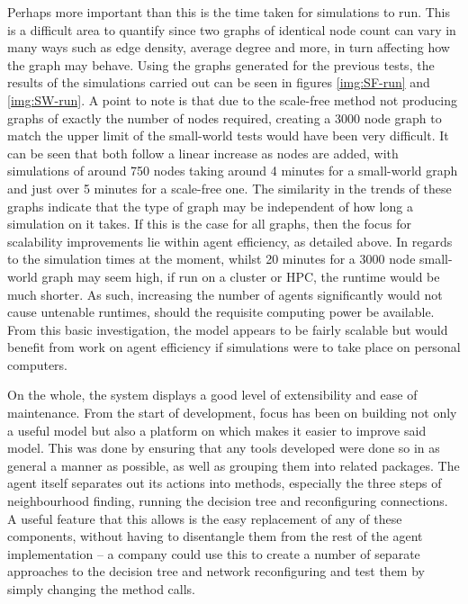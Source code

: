 \documentclass[]{report}
\begin{document}
Perhaps more important than this is the time taken for simulations to run. This is a difficult area to quantify since two graphs of identical node count can vary in many ways such as edge density, average degree and more, in turn affecting how the graph may behave. Using the graphs generated for the previous tests, the results of the simulations carried out can be seen in figures \ref{img:SF-run} and \ref{img:SW-run}. A point to note is that due to the scale-free method not producing graphs of exactly the number of nodes required, creating a 3000 node graph to match the upper limit of the small-world tests would have been very difficult. It can be seen that both follow a linear increase as nodes are added, with simulations of around 750 nodes taking around 4 minutes for a small-world graph and just over 5 minutes for a scale-free one. The similarity in the trends of these graphs indicate that the type of graph may be independent of how long a simulation on it takes. If this is the case for all graphs, then the focus for scalability improvements lie within agent efficiency, as detailed above. In regards to the simulation times at the moment, whilst 20 minutes for a 3000 node small-world graph may seem high, if run on a cluster or HPC, the runtime would be much shorter. As such, increasing the number of agents significantly would not cause untenable runtimes, should the requisite computing power be available. From this basic investigation, the model appears to be fairly scalable but would benefit from work on agent efficiency if simulations were to take place on personal computers.

On the whole, the system displays a good level of extensibility and ease of maintenance. From the start of development, focus has been on building not only a useful model but also a platform on which makes it easier to improve said model. This was done by ensuring that any tools developed were done so in as general a manner as possible, as well as grouping them into related packages. The agent itself separates out its actions into methods, especially the three steps of neighbourhood finding, running the decision tree and reconfiguring connections. A useful feature that this allows is the easy replacement of any of these components, without having to disentangle them from the rest of the agent implementation – a company could use this to create a number of separate approaches to the decision tree and network reconfiguring and test them by simply changing the method calls.
\end{document}
